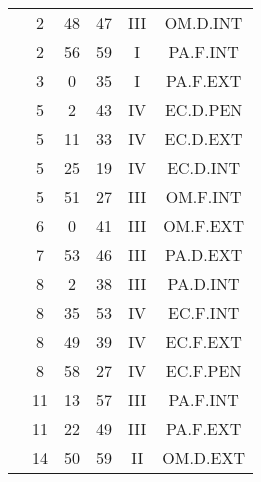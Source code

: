 \documentclass[12pt, a4paper]{article}
\begin{document}
\begin{multicols}{3}
{\begin{tabular}{c c c c c c}
	 	 	 	 & 2 & 48 & 47 & III & OM.D.INT\\%
	 	 	 	 & 2 & 56 & 59 & I & PA.F.INT\\%
	 	 	 	 & 3 & 0 & 35 & I & PA.F.EXT\\%
	 	 	 	 & 5 & 2 & 43 & IV & EC.D.PEN\\%
	 	 	 	 & 5 & 11 & 33 & IV & EC.D.EXT\\%
	 	 	 	 & 5 & 25 & 19 & IV & EC.D.INT\\%
	 	 	 	 & 5 & 51 & 27 & III & OM.F.INT\\%
	 	 	 	 & 6 & 0 & 41 & III & OM.F.EXT\\%
	 	 	 	 & 7 & 53 & 46 & III & PA.D.EXT\\%
	 	 	 	 & 8 & 2 & 38 & III & PA.D.INT\\%
	 	 	 	 & 8 & 35 & 53 & IV & EC.F.INT\\%
	 	 	 	 & 8 & 49 & 39 & IV & EC.F.EXT\\%
	 	 	 	 & 8 & 58 & 27 & IV & EC.F.PEN\\%
	 	 	 	 & 11 & 13 & 57 & III & PA.F.INT\\%
	 	 	 	 & 11 & 22 & 49 & III & PA.F.EXT\\%
	 	 	 	 & 14 & 50 & 59 & II & OM.D.EXT\\%
	 	 \end{tabular}
 	}
\end{multicols}
\end{document}
